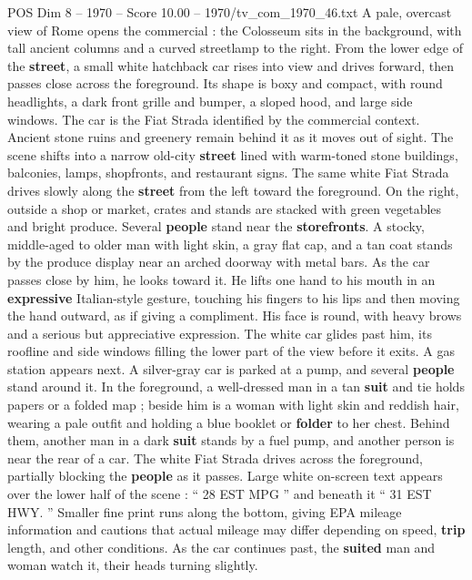 \begin{textsample}{POS Dim 8 – 1970 – Score 10.00 – 1970/tv\_com\_1970\_46.txt}  \label{ex:f8_pos_031}
A pale, overcast view of Rome opens the commercial : the Colosseum sits in the background, with tall ancient columns and a curved streetlamp to the right.
From the lower edge of the \textbf{street}, a small white hatchback car rises into view and drives forward, then passes close across the foreground.
Its shape is boxy and compact, with round headlights, a dark front grille and bumper, a sloped hood, and large side windows.
The car is the Fiat Strada identified by the commercial context.
Ancient stone ruins and greenery remain behind it as it moves out of sight.
The scene shifts into a narrow old-city \textbf{street} lined with warm-toned stone buildings, balconies, lamps, shopfronts, and restaurant signs.
The same white Fiat Strada drives slowly along the \textbf{street} from the left toward the foreground.
On the right, outside a shop or market, crates and stands are stacked with green vegetables and bright produce.
Several \textbf{people} stand near the \textbf{storefronts}.
A stocky, middle-aged to older man with light skin, a gray flat cap, and a tan coat stands by the produce display near an arched doorway with metal bars.
As the car passes close by him, he looks toward it.
He lifts one hand to his mouth in an \textbf{expressive} Italian-style gesture, touching his fingers to his lips and then moving the hand outward, as if giving a compliment.
His face is round, with heavy brows and a serious but appreciative expression.
The white car glides past him, its roofline and side windows filling the lower part of the view before it exits.
A gas station appears next.
A silver-gray car is parked at a pump, and several \textbf{people} stand around it.
In the foreground, a well-dressed man in a tan \textbf{suit} and tie holds papers or a folded map ; beside him is a woman with light skin and reddish hair, wearing a pale outfit and holding a blue booklet or \textbf{folder} to her chest.
Behind them, another man in a dark \textbf{suit} stands by a fuel pump, and another person is near the rear of a car.
The white Fiat Strada drives across the foreground, partially blocking the \textbf{people} as it passes.
Large white on-screen text appears over the lower half of the scene : “ 28 EST MPG ” and beneath it “ 31 EST HWY. ” Smaller fine print runs along the bottom, giving EPA mileage information and cautions that actual mileage may differ depending on speed, \textbf{trip} length, and other conditions.
As the car continues past, the \textbf{suited} man and woman watch it, their heads turning slightly.

\end{textsample}
